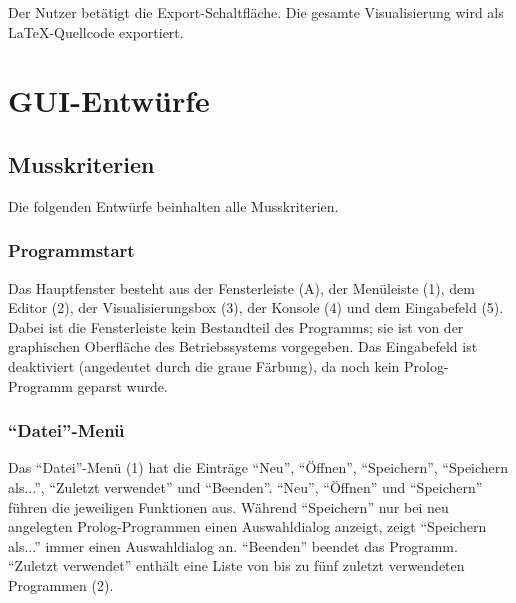 \documentclass[parskip=full,11pt,twoside]{scrartcl}
\begin{document}
{Der Nutzer betätigt die Export-Schaltfläche.}
{Die gesamte Visualisierung wird als LaTeX-Quellcode exportiert.}

\appendix

\section{GUI-Entwürfe}

\subsection{Musskriterien}

Die folgenden Entwürfe beinhalten alle Musskriterien.

\subsubsection{Programmstart}

\begin{minipage}{\linewidth}
\end{minipage}

Das Hauptfenster besteht aus der Fensterleiste (A), der Menüleiste (1), dem Editor (2), der Visualisierungsbox (3), der Konsole (4) und dem Eingabefeld (5).
Dabei ist die Fensterleiste kein Bestandteil des Programms; sie ist von der graphischen Oberfläche des Betriebssystems vorgegeben.
Das Eingabefeld ist deaktiviert (angedeutet durch die graue Färbung), da noch kein Prolog-Programm geparst wurde.

\subsubsection{\enquote{Datei}-Menü}

\begin{minipage}{\linewidth}
\end{minipage}

Das \enquote{Datei}-Menü (1) hat die Einträge \enquote{Neu}, \enquote{Öffnen}, \enquote{Speichern}, \enquote{Speichern als...}, \enquote{Zuletzt verwendet} und \enquote{Beenden}.
\enquote{Neu}, \enquote{Öffnen} und \enquote{Speichern} führen die jeweiligen Funktionen aus.
Während \enquote{Speichern} nur bei neu angelegten Prolog-Programmen einen Auswahldialog anzeigt, zeigt \enquote{Speichern als...} immer einen Auswahldialog an.
\enquote{Beenden} beendet das Programm.
\enquote{Zuletzt verwendet} enthält eine Liste von bis zu fünf zuletzt verwendeten Programmen (2).
\end{document}
